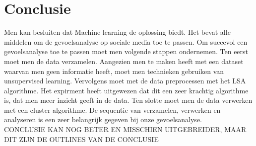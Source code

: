 \section{Conclusie}\label{Conclusie}

Men kan besluiten dat Machine learning de oplossing biedt. Het bevat alle middelen om de gevoelsanalyse op sociale media toe te passen. Om succevol een gevoelsanalyse toe te passen moet men volgende stappen ondernemen. Ten eerst moet men de data verzamelen. Aangezien men te maken heeft met een dataset waarvan men geen informatie heeft, moet men technieken gebruiken van unsupervised learning. Vervolgens moet met de data preprocessen met het LSA algorithme. Het expirment heeft uitgewezen dat dit een zeer krachtig algorithme is, dat men meer inzicht geeft in de data. Ten slotte moet men de data verwerken met een cluster algorithme. De sequentie van verzamelen, verwerken en analyseren is een zeer belangrijk gegeven bij onze gevoelsanalyse.
\\
CONCLUSIE KAN NOG BETER EN MISSCHIEN UITGEBREIDER, MAAR DIT ZIJN DE OUTLINES VAN DE CONCLUSIE
\\